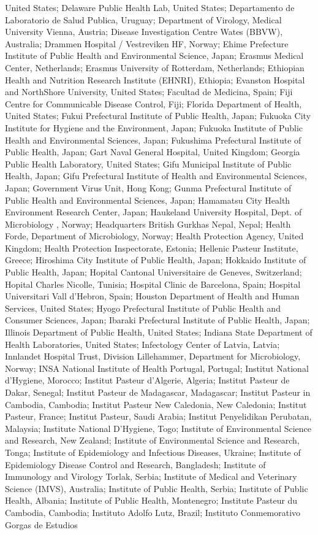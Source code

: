 \begin{appendixbox}
United States; Delaware Public Health Lab, United States; Departamento de Laboratorio de Salud Publica, Uruguay; Department of Virology, Medical University Vienna, Austria; Disease Investigation Centre Wates (BBVW), Australia; Drammen Hospital / Vestreviken HF, Norway; Ehime Prefecture Institute of Public Health and Environmental Science, Japan; Erasmus Medical Center, Netherlands; Erasmus University of Rotterdam, Netherlands; Ethiopian Health and Nutrition Research Institute (EHNRI), Ethiopia; Evanston Hospital and NorthShore University, United States; Facultad de Medicina, Spain; Fiji Centre for Communicable Disease Control, Fiji; Florida Department of Health, United States; Fukui Prefectural Institute of Public Health, Japan; Fukuoka City Institute for Hygiene and the Environment, Japan; Fukuoka Institute of Public Health and Environmental Sciences, Japan; Fukushima Prefectural Institute of Public Health, Japan; Gart Naval General Hospital, United Kingdom; Georgia Public Health Laboratory, United States; Gifu Municipal Institute of Public Health, Japan; Gifu Prefectural Institute of Health and Environmental Sciences, Japan; Government Virus Unit, Hong Kong; Gunma Prefectural Institute of Public Health and Environmental Sciences, Japan; Hamamatsu City Health Environment Research Center, Japan; Haukeland University Hospital, Dept. of Microbiology , Norway; Headquarters British Gurkhas Nepal, Nepal; Health Forde, Department of Microbiology, Norway; Health Protection Agency, United Kingdom; Health Protection Inspectorate, Estonia; Hellenic Pasteur Institute, Greece; Hiroshima City Institute of Public Health, Japan; Hokkaido Institute of Public Health, Japan; Hopital Cantonal Universitaire de Geneves, Switzerland; Hopital Charles Nicolle, Tunisia; Hospital Clinic de Barcelona, Spain; Hospital Universitari Vall d'Hebron, Spain; Houston Department of Health and Human Services, United States; Hyogo Prefectural Institute of Public Health and Consumer Sciences, Japan; Ibaraki Prefectural Institute of Public Health, Japan; Illinois Department of Public Health, United States; Indiana State Department of Health Laboratories, United States; Infectology Center of Latvia, Latvia; Innlandet Hospital Trust, Division Lillehammer, Department for Microbiology, Norway; INSA National Institute of Health Portugal, Portugal; Institut National d'Hygiene, Morocco; Institut Pasteur d'Algerie, Algeria; Institut Pasteur de Dakar, Senegal; Institut Pasteur de Madagascar, Madagascar; Institut Pasteur in Cambodia, Cambodia; Institut Pasteur New Caledonia, New Caledonia; Institut Pasteur, France; Institut Pasteur, Saudi Arabia; Institut Penyelidikan Perubatan, Malaysia; Institute National D'Hygiene, Togo; Institute of Environmental Science and Research, New Zealand; Institute of Environmental Science and Research, Tonga; Institute of Epidemiology and Infectious Diseases, Ukraine; Institute of Epidemiology Disease Control and Research, Bangladesh; Institute of Immunology and Virology Torlak, Serbia; Institute of Medical and Veterinary Science (IMVS), Australia; Institute of Public Health, Serbia; Institute of Public Health, Albania; Institute of Public Health, Montenegro; Institute Pasteur du Cambodia, Cambodia; Instituto Adolfo Lutz, Brazil; Instituto Conmemorativo Gorgas de Estudios 
\end{appendixbox}

